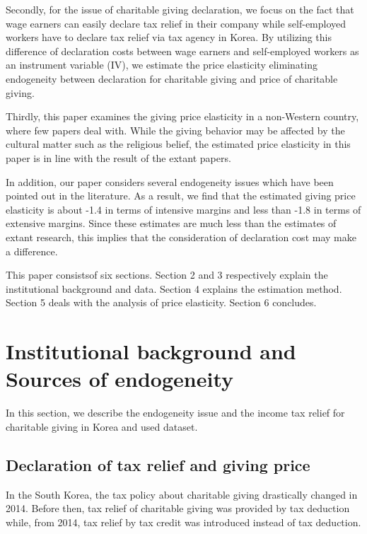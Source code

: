 \documentclass[
  11pt,
  a4paper,
]{article}
\begin{document}
Secondly, for the issue of charitable giving declaration, we focus on the fact that wage earners can easily declare tax relief in their company while self-employed workers have to declare tax relief via tax agency in Korea. By utilizing this difference of declaration costs between wage earners and self-employed workers as an instrument variable (IV), we estimate the price elasticity eliminating endogeneity between declaration for charitable giving and price of charitable giving.

Thirdly, this paper examines the giving price elasticity in a non-Western country, where few papers deal with. While the giving behavior may be affected by the cultural matter such as the religious belief, the estimated price elasticity in this paper is in line with the result of the extant papers.

In addition, our paper considers several endogeneity issues which have been pointed out in the literature. As a result, we find that the estimated giving price elasticity is about -1.4 in terms of intensive margins and less than -1.8 in terms of extensive margins. Since these estimates are much less than the estimates of extant research, this implies that the consideration of declaration cost may make a difference.

This paper consistsof six sections. Section 2 and 3 respectively explain the institutional background and data. Section 4 explains the estimation method. Section 5 deals with the analysis of price elasticity. Section 6 concludes.

\hypertarget{institutional-background-and-sources-of-endogeneity}{%
\section{Institutional background and Sources of endogeneity}\label{institutional-background-and-sources-of-endogeneity}}

In this section, we describe the endogeneity issue and the income tax relief for charitable giving in Korea and used dataset.

\hypertarget{declaration-of-tax-relief-and-giving-price}{%
\subsection{Declaration of tax relief and giving price}\label{declaration-of-tax-relief-and-giving-price}}

In the South Korea, the tax policy about charitable giving drastically changed in 2014. Before then, tax relief of charitable giving was provided by tax deduction while, from 2014, tax relief by tax credit was introduced instead of tax deduction.
\end{document}
